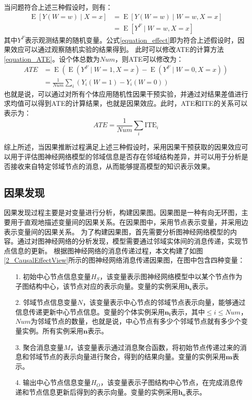 \documentclass[algorithmlist, AutoFakeBold, AutoFakeSlant, figurelist, tablelist, nomlist, engineering]{seuthesix}
\begin{document}
当问题符合上述三种假设时，则有：
\begin{equation}
  \begin{aligned}
  \operatorname{E}[Y(W=w) \mid X=x] & =\operatorname{E}[Y(W=w) \mid W=w, X=x] \\
  & =\operatorname{E}\left[Y^F \mid W=w, X=x\right]
  \end{aligned}
  \label{equation_effect}
\end{equation}
其中$Y^F$表示观测结果的随机变量。公式\ref{equation_effect}即为符合上述假设时，因果效应可以通过观察随机实验的结果得到。
此时可以修改ATE的计算方法\ref{equation_ATE}。设个体总数为$Num$，则ATE可以修改为：
\begin{equation}
  \begin{aligned}
  ATE & =\operatorname{E}\left(\operatorname{E}\left(Y^F \mid W=1, X=x\right)-\operatorname{E}\left(Y^F \mid W=0, X=x\right)\right) \\
  & =\frac{1}{Num} \sum_i\left(Y_i(W=1)-Y_i(W=0)\right)
  \end{aligned}
  \label{equation_newATE}
\end{equation}
也就是说，可以通过对所有个体应用随机性因果干预实验，并通过对结果差值进行求均值可以得到ATE的计算结果，也就是因果效应。此时，ATE和ITE的关系可以表示为：
\begin{equation}
  ATE = \frac{1}{Num} \sum_i \mathrm{ITE}_i
  \label{equation_ATEandITE}
\end{equation}

综上所述，当因果推断过程满足上述三种假设时，采用因果干预获取的因果效应可以用于评估图神经网络模型的邻域信息是否存在邻域结构差异，并可以用于分析是否接收来自特定邻域节点的消息，从而能够提高模型的知识表示效果。

\subsection{因果发现}
因果发现过程主要是对变量进行分析，构建因果图。因果图是一种有向无环图，主要用于直观地描述变量间的因果关系。在因果图中，采用节点表示变量，并采用边表示变量间的因果关系。
为了构建因果图，首先需要分析图神经网络模型的内容。通过对图神经网络的分析发现，模型需要通过邻域实体间的消息传递，实现节点信息的更新。
根据图神经网络的消息传递过程，本文构建了如图\ref{2_CausalEffectView}所示的图神经网络消息传递因果图，在图中包含四种变量：
\begin{itemize}
  \item [1.] 初始中心节点信息变量$H_S$，该变量表示图神经网络模型中以某个节点作为子图结构中心，该节点对应的表示向量。变量的实例采用$\bm{h_s}$表示。
  \item [2.] 邻域节点信息变量$N$，该变量表示中心节点的邻域节点表示向量，能够通过信息传递更新中心节点信息。变量的个体实例采用$\bm{n_i}$表示，其中$\leq i \leq Num$，$Num$为邻域节点的数量，也就是说，中心节点有多少个邻域节点就有多少个变量实例。所有实例采用$\bm{n}$表示。
  \item [3.] 聚合消息变量$M$，该变量表示通过消息聚合函数，将初始节点传递过来的消息和邻域节点的表示向量进行聚合，得到的结果向量。变量的实例采用$\bm{m}$表示。
  \item [4.] 输出中心节点信息变量$H_O$，该变量表示子图结构中心节点，在完成消息传递和节点信息更新后得到的表示向量。变量的实例采用$\bm{h_o}$表示。
\end{itemize}
\end{document}
